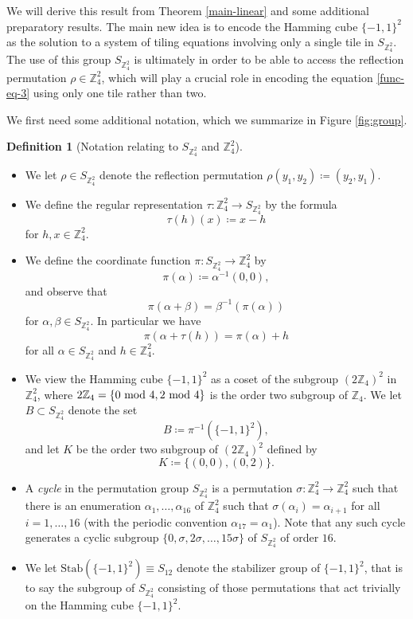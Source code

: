 \documentclass[reqno,a4paper,12pt]{amsart}
\numberwithin{equation}{section}
\numberwithin{figure}{section}
\def\Z{\mathbb{Z}}
\theoremstyle{plain}
\theoremstyle{definition}
\newtheorem{definition}[thm]{Definition}
\begin{document}
We will derive this result from Theorem \ref{main-linear} and some additional preparatory results. The main new idea is to encode the Hamming cube $\{-1,1\}^2$ as the solution to a system of tiling equations involving only a single tile in $S_{\Z_4^2}$.  The use of this group $S_{\Z_4^2}$  is ultimately in order to be able to access the reflection permutation $\rho \in \Z_4^2$, which will play a crucial role in encoding the equation \eqref{func-eq-3} using only one tile rather than two.

We first need some additional notation, which we summarize in Figure \ref{fig:group}.  

\begin{definition}[Notation relating to $S_{\Z_4^2}$ and $\Z_4^2$]\ 
\begin{itemize}
\item[(i)]  We let $\rho \in S_{\Z_4^2}$ denote the reflection permutation $\rho(y_1,y_2) \coloneqq (y_2,y_1)$.
\item[(ii)] We define the regular representation $\tau \colon \Z_4^2\to S_{\Z_4^2}$ by the formula
$$ \tau(h)(x) \coloneqq x-h$$
for $h,x \in \Z_4^2$.
\item[(iii)] We define the coordinate function $\pi \colon S_{\Z_4^2} \to \Z_4^2$ by
$$ \pi(\alpha) \coloneqq \alpha^{-1}(0,0),$$
and observe that
\begin{equation}\label{pi-translate}
\pi(\alpha + \beta) = \beta^{-1}(\pi(\alpha))
\end{equation}
for $\alpha,\beta \in S_{\Z_4^2}$.  In particular we have
\begin{equation}\label{pi-regular}
\pi(\alpha + \tau(h)) = \pi(\alpha) + h
\end{equation}
for all $\alpha \in S_{\Z_4^2}$ and $h \in \Z_4^2$.  
\item[(iv)]  We view the Hamming cube $\{-1,1\}^2$ as a coset of the subgroup $(2\Z_4)^2$ in $\Z_4^2$, where $2\Z_4 = \{ 0 \hbox{ mod } 4, 2 \hbox{ mod } 4\}$ is the order two subgroup of $\Z_4$.  We let $B \subset S_{\Z_4^2}$ denote the set 
\begin{equation}\label{B-def}
    B \coloneqq \pi^{-1}(\{-1,1\}^2),
\end{equation} 
and let $K$ be the order two subgroup of $(2\Z_4)^2$ defined by
$$ K \coloneqq \{ (0,0), (0,2) \}.$$
\item[(v)]  A \emph{cycle} in the permutation group $S_{\Z_4^2}$ is a permutation $\sigma \colon \Z_4^2 \to \Z_4^2$ such that there is an enumeration $\alpha_1,\dots,\alpha_{16}$ of $\Z_4^2$ such that $\sigma(\alpha_i) = \alpha_{i+1}$ for all $i=1,\dots,16$ (with the periodic convention $\alpha_{17}=\alpha_1$).  Note that any such cycle generates a cyclic subgroup $\{0, \sigma, 2\sigma, \dots, 15 \sigma\}$ of $S_{\Z_4^2}$ of order $16$.
\item[(vi)] We let $\mathrm{Stab}(\{-1,1\}^2) \equiv S_{12}$ denote the stabilizer group of $\{-1,1\}^2$, that is to say the subgroup of $S_{\Z_4^2}$ consisting of those permutations that act trivially on the Hamming cube $\{-1,1\}^2$.
\end{itemize}
\end{definition}
\end{document}
